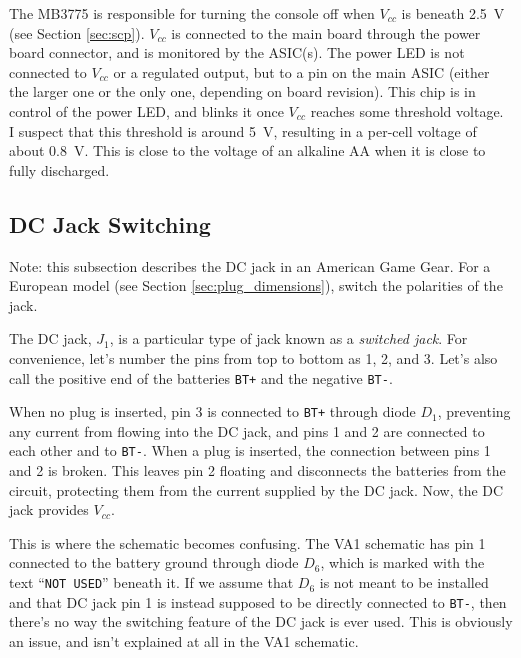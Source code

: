 \documentclass{article}
\newcommand{\Vcc}{$V_{cc}$}
\newcommand{\chippin}{\texttt}
\newcommand{\model}{\textsf}
\begin{document}
The \model{MB3775} is responsible for turning the console off when
\Vcc{} is beneath \qty{2.5}{\volt} (see Section \ref{sec:scp}). \Vcc{}
is connected to the main board through the power board connector, and
is monitored by the ASIC(s). The power LED is not connected to \Vcc{}
or a regulated output, but to a pin on the main ASIC (either the
larger one or the only one, depending on board revision). This chip is
in control of the power LED, and blinks it once \Vcc{} reaches some
threshold voltage. I suspect that this threshold is around
\qty{5}{\volt}, resulting in a per-cell voltage of about
\qty{0.8}{\volt}. This is close to the voltage of an alkaline AA when
it is close to fully discharged.

\subsection{DC Jack Switching}
Note: this subsection describes the DC jack in an American Game
Gear. For a European model (see Section \ref{sec:plug_dimensions}),
switch the polarities of the jack.

The DC jack, $J_1$, is a particular type of jack known as a
\textit{switched jack}. For convenience, let's number the pins from
top to bottom as 1, 2, and 3. Let's also call the positive end of the
batteries \chippin{BT+} and the negative \chippin{BT-}.

When no plug is inserted, pin 3 is connected to \chippin{BT+} through
diode $D_1$, preventing any current from flowing into the DC jack, and
pins 1 and 2 are connected to each other and to \chippin{BT-}. When a
plug is inserted, the connection between pins 1 and 2 is broken. This
leaves pin 2 floating and disconnects the batteries from the circuit,
protecting them from the current supplied by the DC jack. Now, the DC
jack provides \Vcc{}.

This is where the schematic becomes confusing. The \model{VA1}
schematic has pin 1 connected to the battery ground through diode
$D_6$, which is marked with the text ``\texttt{NOT USED}'' beneath
it. If we assume that $D_6$ is not meant to be installed and that DC
jack pin 1 is instead supposed to be directly connected to
\chippin{BT-}, then there's no way the switching feature of the DC
jack is ever used. This is obviously an issue, and isn't explained at
all in the \model{VA1} schematic.
\end{document}
